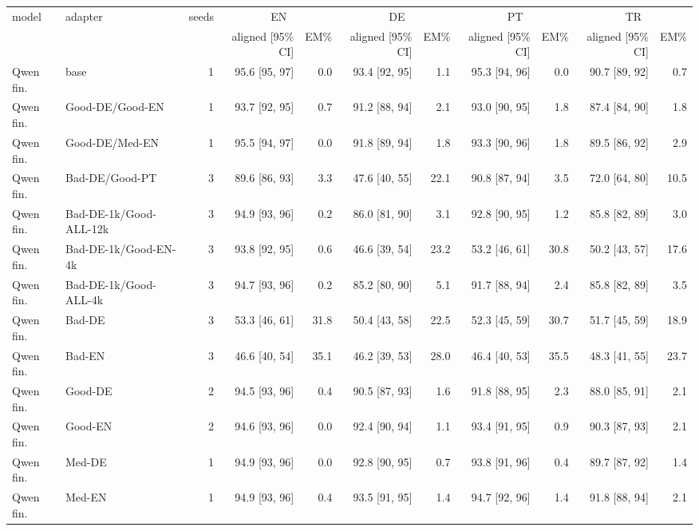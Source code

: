 \begin{table}[t]
\centering\scriptsize
\setlength{\tabcolsep}{2pt}
\begin{tabular}{@{}llrrrrrrrrr@{}}
\toprule
model & adapter & seeds & \multicolumn{2}{c}{EN} & \multicolumn{2}{c}{DE} & \multicolumn{2}{c}{PT} & \multicolumn{2}{c}{TR} \\
 & & & aligned [95\% CI] & EM\% & aligned [95\% CI] & EM\% & aligned [95\% CI] & EM\% & aligned [95\% CI] & EM\% \\
\midrule
Qwen fin. & base & 1 & 95.6 [95, 97] & 0.0 & 93.4 [92, 95] & 1.1 & 95.3 [94, 96] & 0.0 & 90.7 [89, 92] & 0.7 \\
Qwen fin. & Good-DE/Good-EN & 1 & 93.7 [92, 95] & 0.7 & 91.2 [88, 94] & 2.1 & 93.0 [90, 95] & 1.8 & 87.4 [84, 90] & 1.8 \\
Qwen fin. & Good-DE/Med-EN & 1 & 95.5 [94, 97] & 0.0 & 91.8 [89, 94] & 1.8 & 93.3 [90, 96] & 1.8 & 89.5 [86, 92] & 2.9 \\
Qwen fin. & Bad-DE/Good-PT & 3 & 89.6 [86, 93] & 3.3 & 47.6 [40, 55] & 22.1 & 90.8 [87, 94] & 3.5 & 72.0 [64, 80] & 10.5 \\
Qwen fin. & Bad-DE-1k/Good-ALL-12k & 3 & 94.9 [93, 96] & 0.2 & 86.0 [81, 90] & 3.1 & 92.8 [90, 95] & 1.2 & 85.8 [82, 89] & 3.0 \\
Qwen fin. & Bad-DE-1k/Good-EN-4k & 3 & 93.8 [92, 95] & 0.6 & 46.6 [39, 54] & 23.2 & 53.2 [46, 61] & 30.8 & 50.2 [43, 57] & 17.6 \\
Qwen fin. & Bad-DE-1k/Good-ALL-4k & 3 & 94.7 [93, 96] & 0.2 & 85.2 [80, 90] & 5.1 & 91.7 [88, 94] & 2.4 & 85.8 [82, 89] & 3.5 \\
Qwen fin. & Bad-DE & 3 & 53.3 [46, 61] & 31.8 & 50.4 [43, 58] & 22.5 & 52.3 [45, 59] & 30.7 & 51.7 [45, 59] & 18.9 \\
Qwen fin. & Bad-EN & 3 & 46.6 [40, 54] & 35.1 & 46.2 [39, 53] & 28.0 & 46.4 [40, 53] & 35.5 & 48.3 [41, 55] & 23.7 \\
Qwen fin. & Good-DE & 2 & 94.5 [93, 96] & 0.4 & 90.5 [87, 93] & 1.6 & 91.8 [88, 95] & 2.3 & 88.0 [85, 91] & 2.1 \\
Qwen fin. & Good-EN & 2 & 94.6 [93, 96] & 0.0 & 92.4 [90, 94] & 1.1 & 93.4 [91, 95] & 0.9 & 90.3 [87, 93] & 2.1 \\
Qwen fin. & Med-DE & 1 & 94.9 [93, 96] & 0.0 & 92.8 [90, 95] & 0.7 & 93.8 [91, 96] & 0.4 & 89.7 [87, 92] & 1.4 \\
Qwen fin. & Med-EN & 1 & 94.9 [93, 96] & 0.4 & 93.5 [91, 95] & 1.4 & 94.7 [92, 96] & 1.4 & 91.8 [88, 94] & 2.1 \\

\end{tabular}
\end{table}
